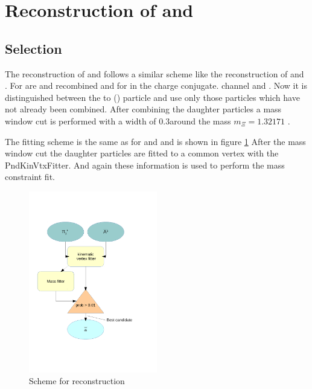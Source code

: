 		
		
		
	
\section{Reconstruction of \cascade and \anticascade}
	\subsection*{Selection}
		The reconstruction of \cascade and \anticascade follows a similar scheme like the reconstruction of \lam and \alam.
		For \anticascade are \alam and \piplusone recombined and for \cascade in the charge conjugate. channel \lam and \piminusone.
		Now it is distinguished between the to \piplus (\piminus) particle and use only those particles which have not already been combined.
		After combining the daughter particles a mass window cut is performed with a width of $0.3$\massunit around 
		the \cascade mass $m_{\Xi} = 1.32171$ \massunit \cite{PDG}.
		 
		The fitting scheme is the same as for \lam and \alam and is shown in figure \ref{fig:anticascade_scheme} 
		After the mass window cut the daughter particles are fitted to a common vertex with the PndKinVtxFitter.
		And again these information is used to perform the mass constraint fit. 
		
		\begin{figure}
			\centering
				\includegraphics[width=0.50\textwidth]{./plots/combineAntiCascade.pdf}
			\caption{\propose Scheme for \anticascade reconstruction}
			\label{fig:anticascade_scheme}
		\end{figure}
		
